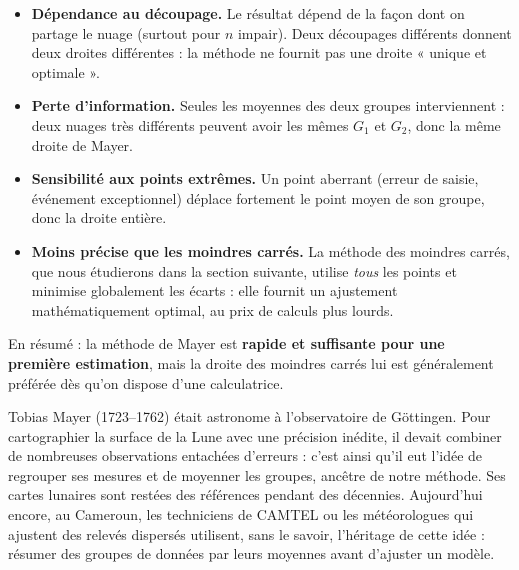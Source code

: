 \documentclass[11pt]{article}
\begin{document}
\begin{attention}
\begin{itemize}
\item \textbf{Dépendance au découpage.} Le résultat dépend de la façon dont on partage le nuage (surtout pour $n$ impair). Deux découpages différents donnent deux droites différentes : la méthode ne fournit pas une droite « unique et optimale ».
\item \textbf{Perte d'information.} Seules les moyennes des deux groupes interviennent : deux nuages très différents peuvent avoir les mêmes $G_1$ et $G_2$, donc la même droite de Mayer.
\item \textbf{Sensibilité aux points extrêmes.} Un point aberrant (erreur de saisie, événement exceptionnel) déplace fortement le point moyen de son groupe, donc la droite entière.
\item \textbf{Moins précise que les moindres carrés.} La méthode des moindres carrés, que nous étudierons dans la section suivante, utilise \emph{tous} les points et minimise globalement les écarts : elle fournit un ajustement mathématiquement optimal, au prix de calculs plus lourds.
\end{itemize}
En résumé : la méthode de Mayer est \textbf{rapide et suffisante pour une première estimation}, mais la droite des moindres carrés lui est généralement préférée dès qu'on dispose d'une calculatrice.
\end{attention}

\begin{savaistu}
Tobias Mayer (1723--1762) était astronome à l'observatoire de Göttingen. Pour cartographier la surface de la Lune avec une précision inédite, il devait combiner de nombreuses observations entachées d'erreurs : c'est ainsi qu'il eut l'idée de regrouper ses mesures et de moyenner les groupes, ancêtre de notre méthode. Ses cartes lunaires sont restées des références pendant des décennies. Aujourd'hui encore, au Cameroun, les techniciens de CAMTEL ou les météorologues qui ajustent des relevés dispersés utilisent, sans le savoir, l'héritage de cette idée : résumer des groupes de données par leurs moyennes avant d'ajuster un modèle.
\end{savaistu}
\end{document}
